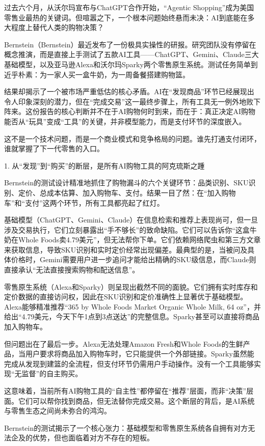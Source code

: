 \documentclass[11pt]{ctexart}
\begin{document}
过去六个月，从沃尔玛宣布与ChatGPT合作开始，“Agentic Shopping”成为美国零售业最热的关键词。但喧嚣之下，一个根本问题始终悬而未决：AI到底能在多大程度上替代人类的购物决策？

Bernstein（Bernstein）最近发布了一份极具实操性的研报。研究团队没有停留在概念推演，而是直接上手测试了五款AI工具——ChatGPT、Gemini、Claude三大基础模型，以及亚马逊Alexa和沃尔玛Sparky两个零售原生系统。测试任务简单到近乎朴素：为一家人买一盒牛奶，为一周备餐搭建购物篮。

结果却揭示了一个被市场严重低估的核心矛盾。AI在“发现商品”环节已经展现出令人印象深刻的潜力，但在“完成交易”这一最终步骤上，所有工具无一例外地败下阵来。这份报告的核心判断并不在于AI购物何时到来，而在于：真正决定AI购物能否从“玩具”变成“工具”的关键，并非模型能力，而是支付环节的深度嵌入。

这不是一个技术问题，而是一个商业模式和竞争格局的问题。谁先打通支付闭环，谁就掌握了下一代零售的入口。

1. 从“发现”到“购买”的断层，是所有AI购物工具的阿克琉斯之踵

Bernstein的测试设计精准地抓住了购物漏斗的六个关键环节：品类识别、SKU识别、定价、总成本估算、加入购物车、支付。结果一目了然：在“加入购物车”和“支付”这两个环节，所有工具都亮起了红灯。

基础模型（ChatGPT、Gemini、Claude）在信息检索和推荐上表现尚可，但一旦涉及交易执行，它们立刻暴露出“手不够长”的致命缺陷。它们可以告诉你“这盒牛奶在Whole Foods卖4.79美元”，但无法帮你下单。它们依赖网络爬虫和第三方文章来获取信息，导致SKU识别和实时定价经常出现偏差。最典型的是，当被问及具体价格时，Gemini需要用户进一步追问才能给出精确的SKU级信息，而Claude则直接承认“无法直接搜索购物和配送信息”。

零售原生系统（Alexa和Sparky）则呈现出截然不同的面貌。它们拥有实时库存和定价数据的直接访问权，因此在SKU识别和定价准确性上显著优于基础模型。Alexa能够精准推荐“365 by Whole Foods Market Organic Whole Milk, 64 oz”，并给出“4.79美元，今天下午1点到3点送达”的完整信息。Sparky甚至可以直接将商品加入购物车。

但问题出在了最后一步。Alexa无法处理Amazon Fresh和Whole Foods的生鲜产品，当用户要求将商品加入购物车时，它只能提供一个外部链接。Sparky虽然能完成从发现到建篮的全流程，但支付环节仍需用户手动操作。没有一个工具能够实现“无监督”的自主购买。

这意味着，当前所有AI购物工具的“自主性”都停留在“推荐”层面，而非“决策”层面。它们可以帮你找到商品，但无法替你完成交易。这个断层的背后，是AI系统与零售生态之间尚未弥合的鸿沟。

Bernstein的测试揭示了一个核心张力：基础模型和零售原生系统各自拥有对方无法企及的优势，但也面临着对方不存在的短板。
\end{document}
